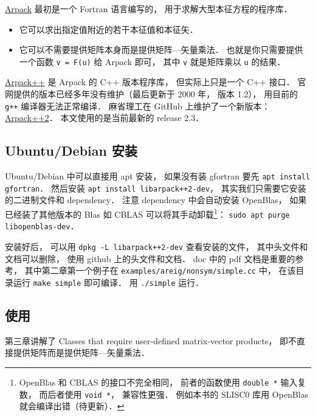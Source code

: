 
\begin{issues}
\issueDraft
\end{issues}


\href{https://www.caam.rice.edu/software/ARPACK/}{Arpack} 最初是一个 Fortran 语言编写的， 用于求解大型本征方程的程序库．
\begin{itemize}
\item 它可以求出指定值附近的若干本征值和本征矢．
\item 它可以不需要提供矩阵本身而是提供矩阵—矢量乘法． 也就是你只需要提供一个函数 \verb|v = F(u)| 给 Arpack 即可， 其中 \verb|v| 就是矩阵乘以 \verb|u| 的结果．
\end{itemize}

\href{http://www.ime.unicamp.br/~chico/arpack++/}{Arpack++} 是 Arpack 的 C++ 版本程序库， 但实际上只是一个 C++ 接口． 官网提供的版本已经多年没有维护（最后更新于 2000 年， 版本 1.2）， 用目前的 \verb|g++| 编译器无法正常编译． 麻省理工在 GitHub 上维护了一个新版本： \href{https://github.com/m-reuter/arpackpp}{Arpack++2}． 本文使用的是当前最新的 release 2.3．

\subsection{Ubuntu/Debian 安装}
Ubuntu/Debian 中可以直接用 apt 安装， 如果没有装 gfortran 要先 \verb|apt install gfortran|． 然后安装 \verb|apt install libarpack++2-dev|， 其实我们只需要它安装的二进制文件和 dependency． 注意 dependency 中会自动安装 OpenBlas， 如果已经装了其他版本的 Blas 如 CBLAS 可以将其手动卸载\footnote{OpenBlas 和 CBLAS 的接口不完全相同， 前者的函数使用 \lstinline|double *| 输入复数， 而后者使用 \verb|void *|， 兼容性更强． 例如本书的 SLISC0 库用 OpenBlas 就会编译出错（待更新）．}： \verb|sudo apt purge libopenblas-dev|．

安装好后， 可以用 \verb|dpkg -L libarpack++2-dev| 查看安装的文件， 其中头文件和文档可以删除， 使用 github 上的头文件和文档． doc 中的 pdf 文档是重要的参考， 其中第二章第一个例子在 \verb|examples/areig/nonsym/simple.cc| 中， 在该目录运行 \verb|make simple| 即可编译． 用 \verb|./simple| 运行．

\subsection{使用}
第三章讲解了 Classes that require user-defined matrix-vector products， 即不直接提供矩阵而是提供矩阵—矢量乘法．

